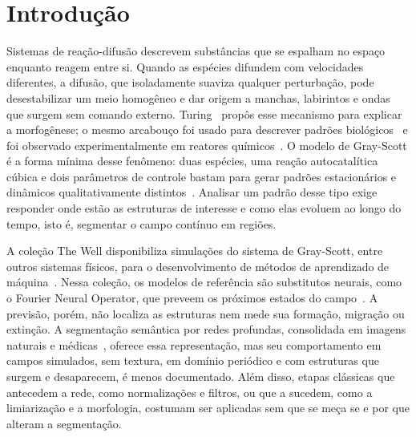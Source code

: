 \documentclass[final,5p,times,twocolumn]{elsarticle}
\begin{document}
\setcounter{tocdepth}{2}
\tableofcontents
\vspace{1em}

\section{Introdução}\label{sec:intro}

Sistemas de reação-difusão descrevem substâncias que se espalham no espaço enquanto reagem entre si. Quando as espécies difundem com velocidades diferentes, a difusão, que isoladamente suaviza qualquer perturbação, pode desestabilizar um meio homogêneo e dar origem a manchas, labirintos e ondas que surgem sem comando externo. Turing~\cite{turing1952} propôs esse mecanismo para explicar a morfogênese; o mesmo arcabouço foi usado para descrever padrões biológicos~\cite{kondo2010,murray2003} e foi observado experimentalmente em reatores químicos~\cite{lee1993}. O modelo de Gray-Scott é a forma mínima desse fenômeno: duas espécies, uma reação autocatalítica cúbica e dois parâmetros de controle bastam para gerar padrões estacionários e dinâmicos qualitativamente distintos~\cite{gray1983,pearson1993}. Analisar um padrão desse tipo exige responder onde estão as estruturas de interesse e como elas evoluem ao longo do tempo, isto é, segmentar o campo contínuo em regiões.

A coleção The Well disponibiliza simulações do sistema de Gray-Scott, entre outros sistemas físicos, para o desenvolvimento de métodos de aprendizado de máquina~\cite{ohana2024well}. Nessa coleção, os modelos de referência são substitutos neurais, como o Fourier Neural Operator, que preveem os próximos estados do campo~\cite{li2021fno,brunton2020}. A previsão, porém, não localiza as estruturas nem mede sua formação, migração ou extinção. A segmentação semântica por redes profundas, consolidada em imagens naturais e médicas~\cite{long2015fcn,ronneberger2015unet,xie2021segformer,cheng2022mask2former}, oferece essa representação, mas seu comportamento em campos simulados, sem textura, em domínio periódico e com estruturas que surgem e desaparecem, é menos documentado. Além disso, etapas clássicas que antecedem a rede, como normalizações e filtros, ou que a sucedem, como a limiarização e a morfologia, costumam ser aplicadas sem que se meça se e por que alteram a segmentação.
\end{document}
